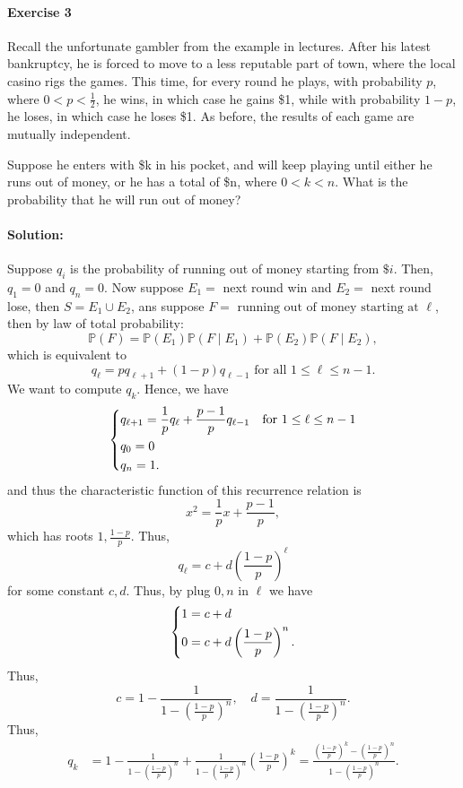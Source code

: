 \documentclass[a4paper,12pt]{article}
\begin{document}
\paragraph{Exercise 3}  Recall the unfortunate gambler from the example in lectures. After his latest bankruptcy, he is forced to move to a less reputable part of town, where the local casino rigs the games. This time, for every round he plays, with probability $p$, where $0 < p < \frac12$, he wins, in which case he gains \$1, while with probability $1 - p$, he loses, in which case he loses \$1. As before, the results of each game are mutually independent.

Suppose he enters with \$k in his pocket, and will keep playing until either he runs out of money, or he has a total of \$n, where $0 < k < n$. What is the probability that he will run out of money?

\paragraph{Solution: } Suppose \(q_i\) is the probability of running out of money starting from \(\$ i\). Then, \(q_1 = 0\) and \(q_n = 0 \). Now suppose \(E_1 = \) next round win and \(E_2 = \) next round lose, then \(S = E_1 \cup E_2 \), ans suppose \(F = \text{ running out of money starting at } \ell\), then by law of total probability:
\[
	\mathbb{P} (F) = \mathbb{P} (E_1) \mathbb{P} (F \mid E_1) + \mathbb{P} (E_2) \mathbb{P} (F \mid E_2),
\]
which is equivalent to
\[
	q_{\ell } = p q_{\ell + 1} + (1 - p) q_{\ell - 1} \text{ for all } 1 \le \ell \le n - 1. 
\]  
We want to compute \(q_k\). Hence, we have 
\[
	\begin{dcases}
		q_{\ell + 1} = \frac{1}{p} q_{\ell } + \frac{p-1}{p} q_{\ell - 1} &\text{for } 1 \le \ell \le n - 1 \\
		q_0 = 0 \\
		q_n = 1.  
	\end{dcases}
\]   
and thus the characteristic function of this recurrence relation is 
\[
	x^2 = \frac{1}{p} x + \frac{p-1}{p},
\]
which has roots \(1, \frac{1-p}{p}\). Thus,
\[
	q_{\ell } = c + d \left( \frac{1-p}{p} \right)^{\ell }  
\] for some constant \(c, d\). Thus, by plug \(0, n\) in \(\ell \) we have 
\[
	\begin{dcases}
		1 = c + d \\
		0 = c + d \left( \frac{1-p}{p} \right)^n.
	\end{dcases}
\] 
Thus, 
\[
	c = 1 - \frac{1}{1 - \left( \frac{1-p}{p} \right)^n }, \quad d = \frac{1}{1 - \left( \frac{1-p}{p} \right)^n }.
\]
Thus,
\begin{align*}
	q_k &= 1 - \frac{1}{1 - \left( \frac{1-p}{p} \right)^n } + \frac{1}{1 - \left( \frac{1-p}{p} \right)^n } \left( \frac{1-p}{p} \right)^k = \frac{\left( \frac{1-p}{p} \right)^k - \left( \frac{1-p}{p} \right)^n  }{1 - \left( \frac{1-p}{p} \right)^n }. 
\end{align*}
\end{document}
